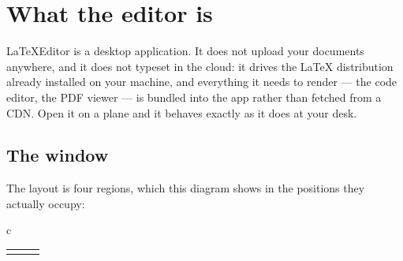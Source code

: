 \section{What the editor is}
\label{sec:overview}

LaTeXEditor is a desktop application. It does not upload your documents
anywhere, and it does not typeset in the cloud: it drives the \LaTeX{}
distribution already installed on your machine, and everything it needs to
render --- the code editor, the PDF viewer --- is bundled into the app rather
than fetched from a CDN. Open it on a plane and it behaves exactly as it does
at your desk.

\subsection{The window}

The layout is four regions, which this diagram shows in the positions they
actually occupy:

\begin{center}
\setlength{\fboxsep}{6pt}
\begin{tabular}{c}
   \\[4pt]
  \begin{tabular}{@{}c@{\hspace{4pt}}c@{\hspace{4pt}}c@{}}
    \fbox{\parbox[t][2.4cm]{0.22\textwidth}{\centering \textbf{Sidebar} \\[3pt] \small
          Files \\ Components \\ AI \\ Git \\ Outline}} &
    \fbox{\parbox[t][2.4cm]{0.30\textwidth}{\centering \textbf{Editor} \\[3pt] \small
          your \texttt{.tex} source}} &
    \fbox{\parbox[t][2.4cm]{0.24\textwidth}{\centering \textbf{Preview} \\[3pt] \small
          the typeset PDF}} \\
  \end{tabular} \\[4pt]
   \\
\end{tabular}
\end{center}

